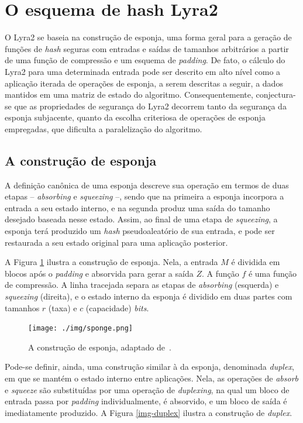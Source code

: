 \documentclass{article}
\begin{document}
\section{O esquema de hash Lyra2}

O Lyra2 se baseia na construção de esponja, uma forma geral para a
geração de funções de \emph{hash} seguras com entradas e saídas de
tamanhos arbitrários a partir de uma função de compressão e um esquema
de \emph{padding}. De fato, o cálculo do Lyra2 para uma determinada entrada pode ser
descrito em alto nível como a aplicação iterada de operações de esponja,
a serem descritas a seguir, a dados mantidos em uma matriz de estado do
algoritmo. Consequentemente, conjectura-se que as propriedades de
segurança do Lyra2 decorrem tanto da segurança da esponja subjacente,
quanto da escolha criteriosa de operações de esponja empregadas, que
dificulta a paralelização do algoritmo.

\subsection{A construção de esponja}

A definição canônica de uma esponja \cite{sponge} descreve sua operação
em termos de duas etapas -- \emph{absorbing} e \emph{squeezing} --,
sendo que na primeira a esponja incorpora a entrada a seu estado
interno, e na segunda produz uma saída do tamanho desejado baseada nesse
estado. Assim, ao final de uma etapa de \emph{squeezing}, a esponja terá
produzido um \emph{hash} pseudoaleatório de sua entrada, e pode ser
restaurada a seu estado original para uma aplicação posterior.

A Figura \ref{img-sponge} ilustra a construção de esponja. Nela, a
entrada $M$ é dividida em blocos após o \emph{padding} e absorvida
para gerar a saída $Z$. A função $f$ é uma função de compressão. A linha
tracejada separa as etapas de \emph{absorbing} (esquerda) e
\emph{squeezing} (direita), e o estado interno da esponja é dividido em
duas partes com tamanhos $r$ (taxa) e $c$ (capacidade)
\emph{bits}.

\begin{figure}[htbp]
\centering
\texttt{[image: ./img/sponge.png]}
\caption{A construção de esponja, adaptado de~\cite{sponge}.\label{img-sponge}}
\end{figure}

Pode-se definir, ainda, uma construção similar à da esponja, denominada
\emph{duplex}, em que se mantém o estado interno entre aplicações. Nela, as
operações de \emph{absorb} e \emph{squeeze} são substituídas por uma operação
de \emph{duplexing}, na qual um bloco de entrada passa por \emph{padding}
individualmente, é absorvido, e um bloco de saída é imediatamente produzido. A
Figura \ref{img-duplex} ilustra a construção de \emph{duplex}.
\end{document}
